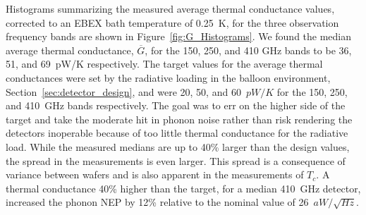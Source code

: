 

Histograms summarizing the measured average thermal conductance values, corrected to an \ac{EBEX} bath temperature of 0.25~K, for the three observation frequency bands are shown in Figure~\ref{fig:G_Histograms}.
We found the median average thermal conductance, $\overline{G}$, for the 150, 250, and 410 GHz bands to be 36, 51, and 69~pW/K respectively. 
The target values for the average thermal conductances were set by the radiative loading in the balloon environment, Section~\ref{sec:detector_design}, and were 20, 50, and 60~$pW/K$ for the 150, 250, and 410~GHz bands respectively. 
The goal was to err on the higher side of the target and take the moderate hit in phonon noise rather than risk rendering the detectors inoperable because of too little thermal conductance for the radiative load. 
While the 
measured medians are up to 40\% larger than the design values, the spread in the measurements is even larger. This spread is 
a consequence of variance between wafers and is also apparent in the measurements of $T_{c}$. 
A thermal conductance 40\% higher than the target, for a median 410~GHz detector, 
increased the phonon \ac{NEP} by 12\% relative to the nominal value of 26~$aW/\sqrt{Hz}$. 



